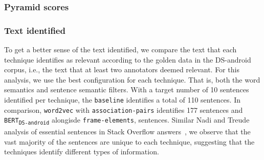 \subsubsection{Pyramid scores}




\subsubsection{Text identified}


To get a better sense of the text identified, we compare the text that each technique identifies as relevant according to the golden data in the \acs{DS-android} corpus, i.e., the text that at least two annotators deemed relevant. For this analysis, 
we use the best configuration for each technique. That is, both the word semantics and sentence semantic filters.
With a target number of 10 sentences identified per technique, the \texttt{baseline} identifies a total of 110 sentences. In comparison, \texttt{word2vec} with \texttt{association-pairs} identifies 177 sentences and \texttt{BERT\textsubscript{DS-android}} alongisde \texttt{frame-elements},  sentences. Similar Nadi and Treude analysis of essential sentences in Stack Overflow answers~\cite{nadi2020}, 
we observe that the vast majority of the sentences are unique to each technique, suggesting that the techniques identify different 
types of information.








% 













% 



